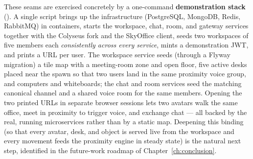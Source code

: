 These seams are exercised concretely by a one-command \textbf{demonstration
stack} (). A single script brings up the infrastructure
(PostgreSQL, MongoDB, Redis, RabbitMQ) in containers, starts the workspace, chat,
room, and gateway services together with the Colyseus fork and the SkyOffice
client, seeds two workspaces of five members each \emph{consistently across every
service}, mints a demonstration JWT, and prints a URL per user. The workspace
service seeds (through a Flyway migration) a tile map with a meeting-room zone and
open floor, five active desks placed near the spawn so that two users land in the
same proximity voice group, and computers and whiteboards; the chat and room
services seed the matching canonical channel and a shared voice room for the same
members. Opening the two printed URLs in separate browser sessions lets two
avatars walk the same office, meet in proximity to trigger voice, and exchange
chat --- all backed by the real, running microservices rather than by a static
map. Deepening this binding (so that every avatar, desk, and object is served
live from the workspace and every movement feeds the proximity engine in steady
state) is the natural next step, identified in the future-work roadmap of
Chapter~\ref{ch:conclusion}.
